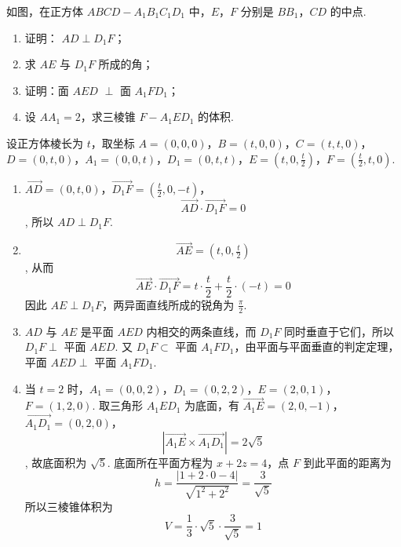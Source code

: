 \documentclass[UTF8,a4paper,oneside,11pt]{ctexbook}
\begin{document}
\begin{problem}
如图，在正方体 \(ABCD - A_{1}B_{1}C_{1}D_{1}\) 中，\(E\)，\(F\) 分别是 \(BB_{1}\)，\(CD\) 的中点.
\begin{enumerate}
\item 证明： \(AD \perp D_{1}F\)；
\item 求 \(AE\) 与 \(D_{1}F\) 所成的角；
\item 证明：面 \(AED\) \(\perp\) 面 \(A_{1}FD_{1}\)；
\item 设 \(AA_{1} = 2\)，求三棱锥 \(F - A_{1}ED_{1}\) 的体积.
\end{enumerate}

\end{problem}

\begin{solution}
设正方体棱长为 \(t\)，取坐标 \(A=(0,0,0)\)，\(B=(t,0,0)\)，\(C=(t,t,0)\)，\(D=(0,t,0)\)，\(A_1=(0,0,t)\)，\(D_1=(0,t,t)\)，\(E=(t,0,\tfrac t2)\)，\(F=(\tfrac t2,t,0)\).
\begin{enumerate}
\item
\(\overrightarrow{AD}=(0,t,0)\)，\(\overrightarrow{D_1F}=(\tfrac t2,0,-t)\)，
\[
\overrightarrow{AD}\cdot\overrightarrow{D_1F}=0
\],
所以 \(AD\perp D_1F\).

\item
\[
\overrightarrow{AE}=(t,0,\tfrac t2)
\],
从而
\[
\overrightarrow{AE}\cdot\overrightarrow{D_1F}
=t\cdot\frac t2+\frac t2\cdot(-t)=0
\]
因此 \(AE\perp D_1F\)，两异面直线所成的锐角为 \(\frac\pi2\).

\item \(AD\) 与 \(AE\) 是平面 \(AED\) 内相交的两条直线，而 \(D_1F\) 同时垂直于它们，所以 \(D_1F\perp\) 平面 \(AED\). 又 \(D_1F\subset\) 平面 \(A_1FD_1\)，由平面与平面垂直的判定定理，平面 \(AED\perp\) 平面 \(A_1FD_1\).

\item 当 \(t=2\) 时，\(A_1=(0,0,2)\)，\(D_1=(0,2,2)\)，\(E=(2,0,1)\)，\(F=(1,2,0)\).
取三角形 \(A_1ED_1\) 为底面，有
\(\overrightarrow{A_1E}=(2,0,-1)\)，\(\overrightarrow{A_1D_1}=(0,2,0)\)，
\[
\left|\overrightarrow{A_1E}\times\overrightarrow{A_1D_1}\right|
=2\sqrt5
\],
故底面积为 \(\sqrt5\). 底面所在平面方程为 \(x+2z=4\)，点 \(F\) 到此平面的距离为
\[
h=\frac{|1+2\cdot0-4|}{\sqrt{1^2+2^2}}=\frac3{\sqrt5}
\]
所以三棱锥体积为
\[
V=\frac13\cdot\sqrt5\cdot\frac3{\sqrt5}=1
\]
\end{enumerate}
\end{solution}
\end{document}
